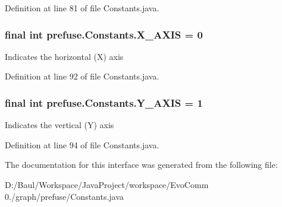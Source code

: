 \-Definition at line 81 of file \-Constants.\-java.

\hypertarget{interfaceprefuse_1_1_constants_afe85a52e151fb9353498b4310a9cb2c8}{
\subsubsection[{\-X\-\_\-\-A\-X\-I\-S}]{\setlength{\rightskip}{0pt plus 5cm}final int {\bf prefuse.\-Constants.\-X\-\_\-\-A\-X\-I\-S} = 0}}\label{interfaceprefuse_1_1_constants_afe85a52e151fb9353498b4310a9cb2c8}
\-Indicates the horizontal (\-X) axis 

\-Definition at line 92 of file \-Constants.\-java.

\hypertarget{interfaceprefuse_1_1_constants_a5e5dd3c5e738bc44a304d1f6a24a6100}{
\subsubsection[{\-Y\-\_\-\-A\-X\-I\-S}]{\setlength{\rightskip}{0pt plus 5cm}final int {\bf prefuse.\-Constants.\-Y\-\_\-\-A\-X\-I\-S} = 1}}\label{interfaceprefuse_1_1_constants_a5e5dd3c5e738bc44a304d1f6a24a6100}
\-Indicates the vertical (\-Y) axis 

\-Definition at line 94 of file \-Constants.\-java.



\-The documentation for this interface was generated from the following file\-:\begin{DoxyCompactItemize}
\item 
\-D\-:/\-Baul/\-Workspace/\-Java\-Project/workspace/\-Evo\-Comm 0./graph/prefuse/\-Constants.\-java\end{DoxyCompactItemize}
